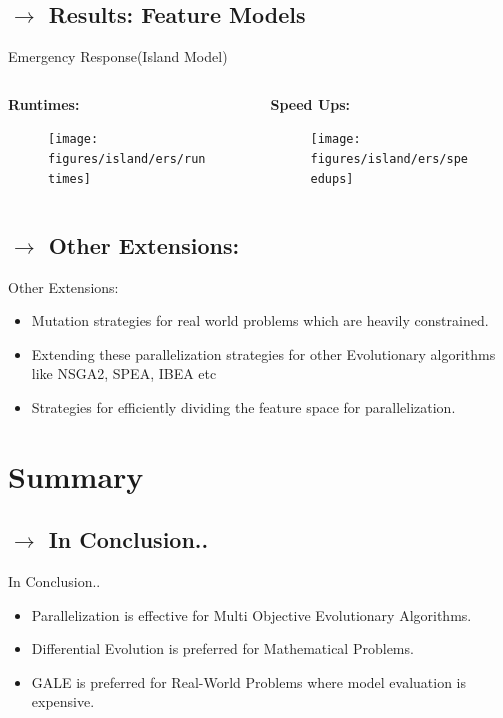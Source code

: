 \documentclass[10pt]{beamer}
\begin{document}
\subsection{$\rightarrow$ Results: Feature Models}
\begin{frame}{Emergency Response(Island Model)}
    \begin{columns}[t]
        \begin{column}{0.5\linewidth}
        \textbf{Runtimes:}
        \begin{figure}
            \centering
            \texttt{[image: figures/island/ers/runtimes]}
            \label{fig:ERS_runtimes}
        \end{figure}
        \end{column}
        \begin{column}{0.5\linewidth}
        \textbf{Speed Ups:}
        \begin{figure}
            \centering
            \texttt{[image: figures/island/ers/speedups]}
            \label{fig:ERS_speedups}
        \end{figure}
        \end{column}
    \end{columns}
\end{frame}


\subsection{$\rightarrow$ Other Extensions:}
\begin{frame}{Other Extensions:}
    \begin{itemize}
    \item<1-> Mutation strategies for real world problems which are heavily constrained.
    \item<2-> Extending these parallelization strategies for other Evolutionary algorithms like NSGA2, SPEA, IBEA etc
    \item<3-> Strategies for efficiently dividing the feature space for parallelization.
    \end{itemize}

\end{frame}

\section*{Summary}
\subsection*{$\rightarrow$ In Conclusion..}
\begin{frame}{In Conclusion..}
\begin{itemize}
\item<1-> Parallelization is effective for Multi Objective Evolutionary Algorithms.
\item<2-> Differential Evolution is preferred for Mathematical Problems.
\item<3-> GALE is preferred for Real-World Problems where model evaluation is expensive.
\end{itemize}

\end{frame}
\end{document}
